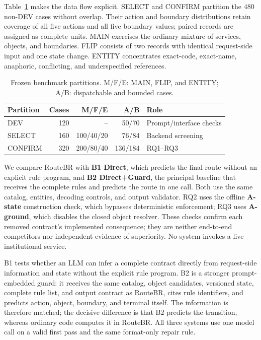 \documentclass[10pt,conference,a4paper]{IEEEtran}
\newcommand{\method}{RouteBR}
\begin{document}
Table~\ref{tab:splits} makes the data flow explicit. SELECT and CONFIRM partition the 480 non-DEV cases without overlap. Their action and boundary distributions retain coverage of all five actions and all five boundary values; paired records are assigned as complete units. MAIN exercises the ordinary mixture of services, objects, and boundaries. FLIP consists of two records with identical request-side input and one state change. ENTITY concentrates exact-code, exact-name, anaphoric, conflicting, and underspecified references.

\begin{table}[!t]
\caption{Frozen benchmark partitions. M/F/E: MAIN, FLIP, and ENTITY; A/B: dispatchable and bounded cases.}
\label{tab:splits}
\centering
\footnotesize
\setlength{\tabcolsep}{3.2pt}
\renewcommand{\arraystretch}{1.14}
\begin{tabular}{@{}lrrrl@{}}
\toprule
Partition & Cases & M/F/E & A/B & Role \\
\midrule
DEV & 120 & -- & 50/70 & Prompt/interface checks \\
SELECT & 160 & 100/40/20 & 76/84 & Backend screening \\
CONFIRM & 320 & 200/80/40 & 136/184 & RQ1--RQ3 \\
\bottomrule
\end{tabular}
\end{table}

We compare \method{} with \textbf{B1 Direct}, which predicts the final route without an explicit rule program, and \textbf{B2 Direct+Guard}, the principal baseline that receives the complete rules and predicts the route in one call. Both use the same catalog, entities, decoding controls, and output validator. RQ2 uses the offline \textbf{A-state} construction check, which bypasses deterministic enforcement; RQ3 uses \textbf{A-ground}, which disables the closed object resolver. These checks confirm each removed contract's implemented consequence; they are neither end-to-end competitors nor independent evidence of superiority. No system invokes a live institutional service.

B1 tests whether an LLM can infer a complete contract directly from request-side information and state without the explicit rule program. B2 is a stronger prompt-embedded guard: it receives the same catalog, object candidates, versioned state, complete rule list, and output contract as \method{}, cites rule identifiers, and predicts action, object, boundary, and terminal itself. The information is therefore matched; the decisive difference is that B2 predicts the transition, whereas ordinary code computes it in \method{}. All three systems use one model call on a valid first pass and the same format-only repair rule.
\end{document}
